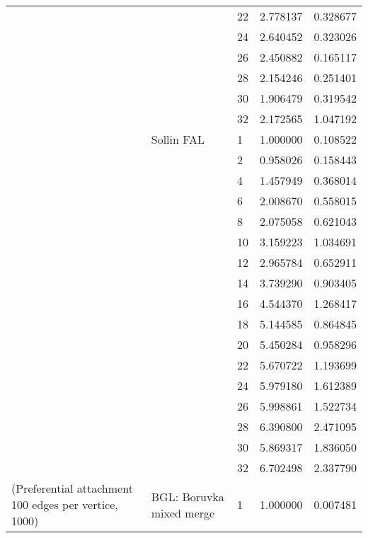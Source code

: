 \begin{tabular}{lllrr}
                      &            & 22 &  2.778137 &  0.328677 \\
                      &            & 24 &  2.640452 &  0.323026 \\
                      &            & 26 &  2.450882 &  0.165117 \\
                      &            & 28 &  2.154246 &  0.251401 \\
                      &            & 30 &  1.906479 &  0.319542 \\
                      &            & 32 &  2.172565 &  1.047192 \\
                      & Sollin FAL & 1  &  1.000000 &  0.108522 \\
                      &            & 2  &  0.958026 &  0.158443 \\
                      &            & 4  &  1.457949 &  0.368014 \\
                      &            & 6  &  2.008670 &  0.558015 \\
                      &            & 8  &  2.075058 &  0.621043 \\
                      &            & 10 &  3.159223 &  1.034691 \\
                      &            & 12 &  2.965784 &  0.652911 \\
                      &            & 14 &  3.739290 &  0.903405 \\
                      &            & 16 &  4.544370 &  1.268417 \\
                      &            & 18 &  5.144585 &  0.864845 \\
                      &            & 20 &  5.450284 &  0.958296 \\
                      &            & 22 &  5.670722 &  1.193699 \\
                      &            & 24 &  5.979180 &  1.612389 \\
                      &            & 26 &  5.998861 &  1.522734 \\
                      &            & 28 &  6.390800 &  2.471095 \\
                      &            & 30 &  5.869317 &  1.836050 \\
                      &            & 32 &  6.702498 &  2.337790 \\
(Preferential attachment 100 edges per vertice, 1000) & BGL: Boruvka mixed merge & 1  &  1.000000 &  0.007481 \\

\end{tabular}

